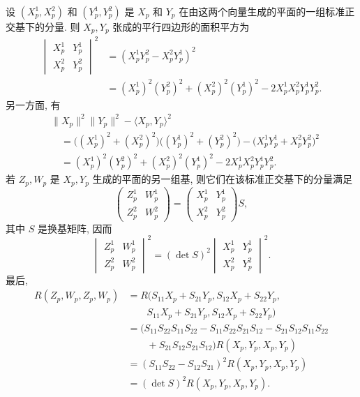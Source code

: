 \begin{description}[font=\normalfont,leftmargin=2em,labelwidth=1.5em]
设 $(X_p^1,X_p^2)$ 和 $(Y_p^1,Y_p^2)$ 是 $X_p$ 和 $Y_p$ 在由这两个向量生成的平面的一组标准正交基下的分量. 则 $X_p,Y_p$ 张成的平行四边形的面积平方为
\begin{align*}
 \begin{vmatrix}X_p^1&Y_p^1\\X_p^2&Y_p^2\end{vmatrix}^{\!2}
  &=(X_p^1Y_p^2-X_p^2Y_p^1)^2\\
  &=(X_p^1)^2(Y_p^2)^2+(X_p^2)^2(Y_p^1)^2-2X_p^1X_p^2Y_p^1Y_p^2.
\end{align*}
另一方面, 有
\begin{align*}
  &\lVert X_p\rVert^2\lVert Y_p\rVert^2-\langle X_p,Y_p\rangle^2\\
  &\quad=\bigl((X_p^1)^2+(X_p^2)^2\bigr)\bigl((Y_p^1)^2+(Y_p^2)^2\bigr)
      -\bigl(X_p^1Y_p^1+X_p^2Y_p^2\bigr)^2\\
  &\quad=(X_p^1)^2(Y_p^2)^2+(X_p^2)^2(Y_p^1)^2-2X_p^1X_p^2Y_p^1Y_p^2.
\end{align*}
若 $Z_p,W_p$ 是 $X_p,Y_p$ 生成的平面的另一组基, 则它们在该标准正交基下的分量满足
\[
  \begin{pmatrix}Z_p^1&W_p^1\\Z_p^2&W_p^2\end{pmatrix}
  =\begin{pmatrix}X_p^1&Y_p^1\\X_p^2&Y_p^2\end{pmatrix}S,
\]
其中 $S$ 是换基矩阵, 因而
\[
  \begin{vmatrix}Z_p^1&W_p^1\\Z_p^2&W_p^2\end{vmatrix}^{\!2}
  =(\det S)^2\begin{vmatrix}X_p^1&Y_p^1\\X_p^2&Y_p^2\end{vmatrix}^{\!2}.
\]
最后,
\begin{align*}
  R(Z_p,W_p,Z_p,W_p)
  &=R(S_{11}X_p+S_{21}Y_p,S_{12}X_p+S_{22}Y_p,\\
  &\qquad S_{11}X_p+S_{21}Y_p,S_{12}X_p+S_{22}Y_p)\\
  &=\bigl(S_{11}S_{22}S_{11}S_{22}-S_{11}S_{22}S_{21}S_{12}
       -S_{21}S_{12}S_{11}S_{22}\\
  &\qquad+S_{21}S_{12}S_{21}S_{12}\bigr)R(X_p,Y_p,X_p,Y_p)\\
  &=(S_{11}S_{22}-S_{12}S_{21})^2R(X_p,Y_p,X_p,Y_p)\\
  &=(\det S)^2R(X_p,Y_p,X_p,Y_p).
\end{align*}


\end{description}
